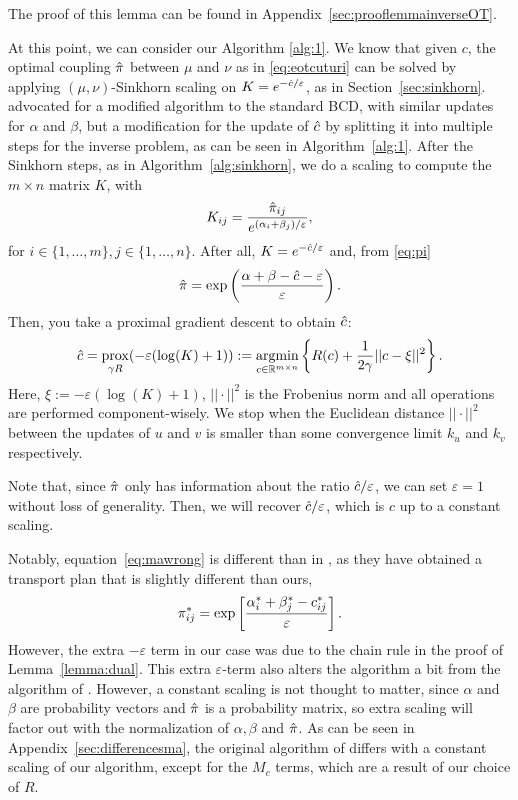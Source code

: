 The proof of this lemma can be found in Appendix~\ref{sec:prooflemmainverseOT}. \par 
At this point, we can consider our Algorithm \ref{alg:1}. We know that given $c$, the optimal coupling $\hat{\pi}$ between $\mu$ and $\nu$ as in \eqref{eq:eotcuturi} can be solved by applying $(\mu, \nu)$-Sinkhorn scaling on $K = e^{-\hat{c}/\varepsilon}$, as in Section~\ref{sec:sinkhorn}. \citet{ma2021} advocated for a modified algorithm to the standard BCD, with similar updates for $\alpha$ and $\beta$, but a modification for the update of $\hat{c}$ by splitting it into multiple steps for the inverse problem, as can be seen in Algorithm~\ref{alg:1}. After the Sinkhorn steps, as in Algorithm~\ref{alg:sinkhorn}, we do a scaling to compute the $m\times n$ matrix $K$, with 
\begin{equation}
	K_{ij} = \frac{\hat{\pi}_{ij}}{e^{(\alpha_i +\beta_j)/\varepsilon}},
	\label{eq:mawrong}
\end{equation}
for $i\in \{1, \dots, m\}, j \in \{1, \dots, n\}$. After all, $K = e^{-\hat{c}/\varepsilon}$ and, from \eqref{eq:pi}
\[\hat{\pi} = \exp\left(\frac{\alpha + \beta - \hat{c} - \varepsilon}{\varepsilon}\right).\]
Then, you take a proximal gradient descent to obtain $\hat{c}$: 
\begin{equation}
	\hat{c} = \operatorname*{prox}_{\gamma R} (-\varepsilon (\log(K) + 1)) := \operatorname*{argmin}_{c \in \mathbb{R}^{m \times n}} \left\{	R(c) + \frac{1}{2\gamma} ||c - \xi||^2\right\}.
	\label{eq:prox}
\end{equation}
Here, $\xi := -\varepsilon (\log(K) + 1)$, $||\cdot||^2$ is the Frobenius norm and all operations are performed component-wisely. We stop when the Euclidean distance $||\cdot||^2$ between the updates of $u$ and $v$ is smaller than some convergence limit $k_u$ and $k_v$ respectively. \par 
\vspace{0.3cm}
\begin{remark}
	Note that, since $\hat{\pi}$ only has information about the ratio $\hat{c}/\varepsilon$, we can set $\varepsilon = 1$ without loss of generality. Then, we will recover $\hat{c}/\varepsilon$, which is $c$ up to a constant scaling.
\end{remark}
\vspace{0.3cm}
\begin{remark}
	Notably, equation~\eqref{eq:mawrong} is different than in \citet{ma2021}, as they have obtained a transport plan that is slightly different than ours, 
		\[ \pi_{ij}^* = \exp\left[\frac{\alpha_i^* + \beta_j^* - c_{ij}^*}{\varepsilon}\right]. \] 
	However, the extra $-\varepsilon$ term in our case was due to the chain rule in the proof of Lemma~\ref{lemma:dual}. This extra $\varepsilon$-term also alters the algorithm a bit from the algorithm of \citet{ma2021}. However, a constant scaling is not thought to matter, since $\alpha$ and $\beta$ are probability vectors and $\hat{\pi}$ is a probability matrix, so extra scaling will factor out with the normalization of $\alpha, \beta$ and $\hat{\pi}$. As can be seen in Appendix~\ref{sec:differencesma}, the original algorithm of \citet{ma2021} differs with a constant scaling of our algorithm, except for the $M_c$ terms, which are a result of our choice of $R$. 
	\label{rem:mawrong}
\end{remark}
